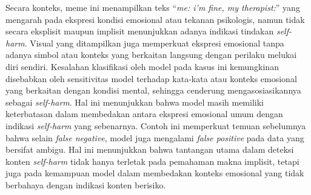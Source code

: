 Secara konteks, meme ini menampilkan teks ``\textit{me: i'm fine, my therapist:}'' yang mengarah pada ekspresi kondisi emosional atau tekanan psikologis, namun tidak secara eksplisit maupun implisit menunjukkan adanya indikasi tindakan \textit{self-harm}. Visual yang ditampilkan juga memperkuat ekspresi emosional tanpa adanya simbol atau konteks yang berkaitan langsung dengan perilaku melukai diri sendiri. Kesalahan klasifikasi oleh model pada kasus ini kemungkinan disebabkan oleh sensitivitas model terhadap kata-kata atau konteks emosional yang berkaitan dengan kondisi mental, sehingga cenderung mengasosiasikannya sebagai \textit{self-harm}. Hal ini menunjukkan bahwa model masih memiliki keterbatasan dalam membedakan antara ekspresi emosional umum dengan indikasi \textit{self-harm} yang sebenarnya. Contoh ini memperkuat temuan sebelumnya bahwa selain \textit{false negative}, model juga mengalami \textit{false positive} pada data yang bersifat ambigu. Hal ini menunjukkan bahwa tantangan utama dalam deteksi konten \textit{self-harm} tidak hanya terletak pada pemahaman makna implisit, tetapi juga pada kemampuan model dalam membedakan konteks emosional yang tidak berbahaya dengan indikasi konten berisiko.

\clearpage

